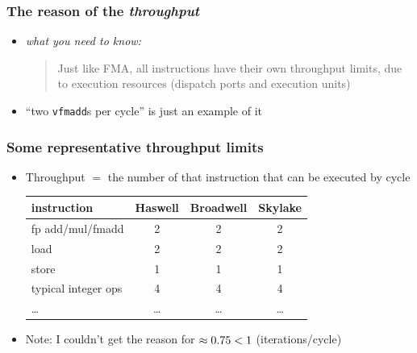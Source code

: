 \documentclass[12pt,dvipdfmx]{beamer}
\newcommand{\ao}[1]{{\color{blue}#1}}
\newcommand{\aka}[1]{{\color{red}#1}}
\begin{document}
\begin{frame}
\frametitle{The reason of the \ao{\em throughput}}

\begin{itemize}
\item \ao{\emph{what you need to know:}}
  \begin{quote}
    Just like FMA, all instructions have their
    own throughput limits,
    due to 
    execution resources (dispatch ports and execution units)
\end{quote}

\item ``two \texttt{vfmadd}s per cycle'' is just an example of it

\end{itemize}


\end{frame}

\begin{frame}
\frametitle{Some representative throughput limits}

\begin{itemize}
\item Throughput $=$ the number of
  that instruction that can be executed by cycle

\begin{center}
{\small
  \begin{tabular}{|l|c|c|c|}\hline
instruction           & Haswell & Broadwell & Skylake \\\hline
  fp add/mul/fmadd    & 2       & 2         & 2 \\
  load                & 2       & 2         & 2 \\
  store               & 1       & 1         & \aka{1} \\
  typical integer ops & 4       & 4         & 4 \\
  \ldots              & \ldots  & \ldots    & \ldots \\
\hline
  \end{tabular}
}
\end{center}

\item Note: I couldn't get
  the reason for $\approx \aka{0.75} < 1$ (iterations/cycle)

\end{itemize}
\end{frame}
\end{document}
